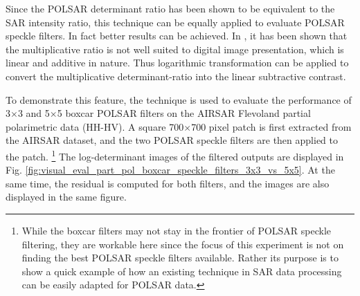 \documentclass[journal]{IEEEtran}
\begin{document}
Since the POLSAR determinant ratio has been shown to be equivalent to the SAR intensity ratio,
  this technique can be equally applied to evaluate POLSAR speckle filters.
In fact better results can be achieved.
In \cite{Medeiros_2003_IJRS}, it has been shown that the multiplicative ratio is not  well suited to digital image presentation,
  which is linear and additive in nature.
Thus logarithmic transformation can be applied to convert the multiplicative determinant-ratio into the linear subtractive contrast.  

To demonstrate this feature, the technique is used to evaluate the performance of 3$\times$3 and 5$\times$5 boxcar POLSAR filters on the AIRSAR Flevoland partial polarimetric data (HH-HV).
  A square 700$\times$700 pixel patch is first extracted from the AIRSAR dataset,
  and the two POLSAR speckle filters are then applied to the patch.
\footnote{While the boxcar filters may not stay in the frontier of POLSAR speckle filtering,
  they are workable here since the focus of this experiment is not on finding the best POLSAR speckle filters available.
  Rather its purpose is to show a quick example of how an existing technique in SAR data processing can be easily adapted for POLSAR data.} 
The log-determinant images of the filtered outputs are displayed in Fig. \ref{fig:visual_eval_part_pol_boxcar_speckle_filters_3x3_vs_5x5}.
At the same time, the residual is computed for both filters, and the images are also displayed in the same figure.
\end{document}
